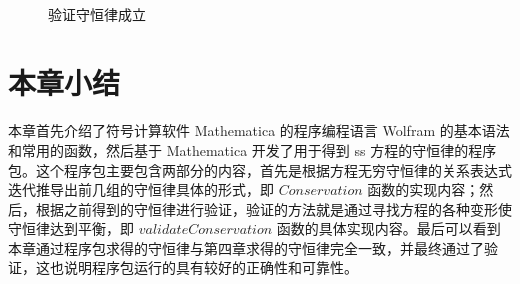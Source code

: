 \begin{figure}[!htp]
	\centering
	\ \
    \caption{验证守恒律成立}
	\label{picture-5-3}
\end{figure}



\section{本章小结}
本章首先介绍了符号计算软件 Mathematica 的程序编程语言 Wolfram 的基本语法和常用的函数，然后基于 Mathematica 开发了用于得到 ss 方程的守恒律的程序包。这个程序包主要包含两部分的内容，首先是根据方程无穷守恒律的关系表达式迭代推导出前几组的守恒律具体的形式，即 $Conservation$ 函数的实现内容；然后，根据之前得到的守恒律进行验证，验证的方法就是通过寻找方程的各种变形使守恒律达到平衡，即 $validateConservation$ 函数的具体实现内容。最后可以看到本章通过程序包求得的守恒律与第四章求得的守恒律完全一致，并最终通过了验证，这也说明程序包运行的具有较好的正确性和可靠性。


